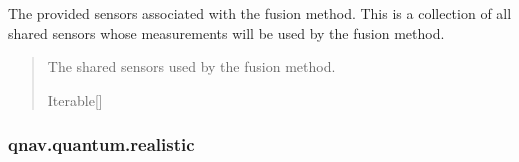 \documentclass[letterpaper,10pt,english]{sphinxmanual}
\begin{document}
\begin{fulllineitems}
\begin{fulllineitems}
\label{\detokenize{modules/quantum/base:qnav.quantum.base.ConceptQuantumFusion.sensors}}
\pysigstartsignatures
{}
\pysigstopsignatures
\sphinxAtStartPar
The provided sensors associated with the fusion method.
This is a collection of all shared sensors whose measurements will be
used by the fusion method.
\begin{quote}\begin{description}
\sphinxAtStartPar
The shared sensors used by the fusion method.

\sphinxAtStartPar
Iterable{[}{\hyperref[\detokenize{modules/measurement/sensor:qnav.measurement.sensor.Sensor}]{}}{]}

\end{description}\end{quote}

\end{fulllineitems}


\end{fulllineitems}


\sphinxstepscope


\subsubsection{qnav.quantum.realistic}
\label{\detokenize{modules/quantum/realistic:module-qnav.quantum.realistic}}\label{\detokenize{modules/quantum/realistic:qnav-quantum-realistic}}\label{\detokenize{modules/quantum/realistic::doc}}
\end{document}
